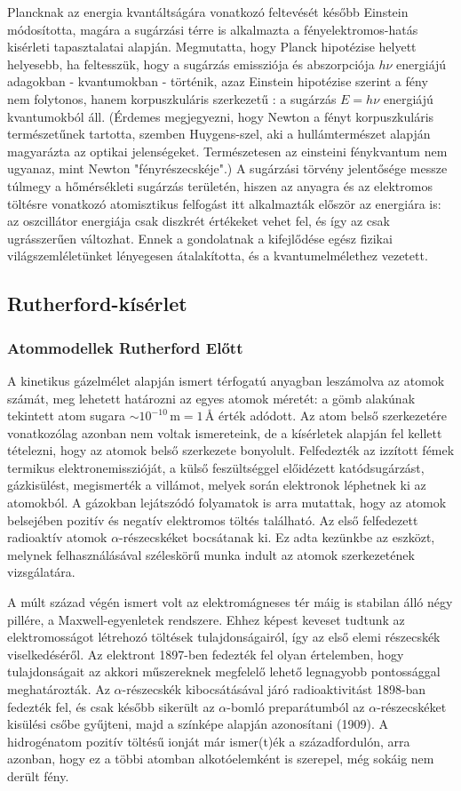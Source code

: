 \documentclass[../main.tex]{subfiles}
\begin{document}
Plancknak az energia kvantáltságára vonatkozó feltevését később Einstein módosította, magára a sugárzási térre is alkalmazta a fényelektromos-hatás
kisérleti tapasztalatai alapján. Megmutatta, hogy Planck hipotézise helyett helyesebb, ha feltesszük, hogy a sugárzás emissziója és abszorpciója $h\nu$ energiájú adagokban - kvantumokban - történik,
azaz Einstein hipotézise szerint a fény nem folytonos, hanem korpuszkuláris szerkezetű : a sugárzás $E = h\nu$ energiájú kvantumokból áll. (Érdemes
megjegyezni, hogy Newton a fényt korpuszkuláris természetűnek tartotta, szemben Huygens-szel, aki a hullámtermészet alapján magyarázta az optikai jelenségeket. Természetesen az einsteini fénykvantum nem ugyanaz, mint
Newton "fényrészecskéje".) A sugárzási törvény jelentősége messze túlmegy a hőmérsékleti sugárzás területén, hiszen az anyagra és az elektromos töltésre vonatkozó atomisztikus felfogást itt alkalmazták először az energiára is: az oszcillátor energiája
csak diszkrét értékeket vehet fel, és így az csak ugrásszerűen változhat. Ennek a gondolatnak a kifejlődése egész fizikai világszemléletünket lényegesen átalakította, és a kvantumelmélethez vezetett.

\subsection{Rutherford-kísérlet}
\subsubsection{Atommodellek Rutherford Előtt}
A kinetikus gázelmélet alapján ismert térfogatú anyagban leszámolva az atomok számát, meg lehetett határozni az egyes atomok méretét: a gömb alakúnak tekintett atom sugara $\sim 10^{-10}\,\mathrm{m}=1\,\text{\AA}$ érték adódott.
Az atom belső szerkezetére vonatkozólag azonban nem voltak ismereteink, de a kísérletek alapján fel kellett tételezni, hogy az atomok belső szerkezete bonyolult. Felfedezték az izzított fémek termikus elektronemisszióját, a külső feszültséggel előidézett katódsugárzást, gázkisülést, megismerték a villámot, melyek során elektronok léphetnek ki az atomokból.
A gázokban lejátszódó folyamatok is arra mutattak, hogy az atomok belsejében pozitív és negatív elektromos töltés található. Az első felfedezett radioaktív atomok $\alpha$-részecskéket bocsátanak ki. Ez adta kezünkbe az eszközt, melynek felhasználásával széleskörű munka indult az atomok szerkezetének vizsgálatára.

A múlt század végén ismert volt az elektromágneses tér máig is stabilan álló négy pillére, a Maxwell-egyenletek rendszere. Ehhez képest keveset tudtunk az elektromosságot létrehozó töltések tulajdonságairól, így az első elemi részecskék viselkedéséről. Az elektront 1897-ben fedezték fel olyan értelemben, hogy tulajdonságait az akkori műszereknek megfelelő lehető legnagyobb pontossággal meghatározták.
Az $\alpha$-részecskék kibocsátásával járó radioaktivitást 1898-ban fedezték fel, és csak később sikerült az $\alpha$-bomló preparátumból az $\alpha$-részecskéket kisülési csőbe gyűjteni, majd a színképe alapján azonosítani (1909). A hidrogénatom pozitív töltésű ionját már ismer(t)ék a századfordulón, arra azonban, hogy ez a többi atomban alkotóelemként is szerepel, még sokáig nem derült fény.
\end{document}
